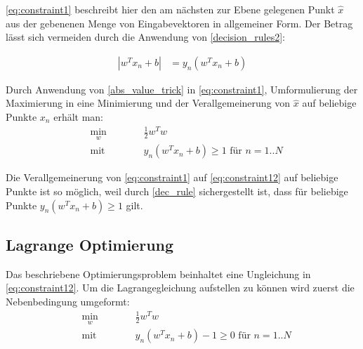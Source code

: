 \documentclass[a4paper,11pt,twoside]{scrreprt}
\begin{document}
\autoref{eq:constraint1} beschreibt hier den am nächsten zur Ebene gelegenen Punkt $\hat{x}$ aus der gebenenen Menge von Eingabevektoren in allgemeiner Form. Der Betrag lässt sich vermeiden durch die Anwendung von \autoref{decision_rules2}:

\begin{equation} \label{abs_value_trick}
	\begin{aligned}
		|w^{T} x_{n} + b| &= y_{n} (w^{T} x_{n} + b)
	\end{aligned}
\end{equation}


Durch Anwendung von \autoref{abs_value_trick} in \autoref{eq:constraint1}, Umformulierung der Maximierung in eine Minimierung und der Verallgemeinerung von $\hat{x}$ auf beliebige Punkte $x_{n}$ erhält man:
\begin{subequations}
	\begin{alignat}{2}
		&\!\min_{w}        &\qquad&  \frac{1}{2} w^{T} w \label{eq:optProb2}\\
		&\text{mit } &      & y_n (w^{T} x_{n} + b) \geq 1 \text{ für } n=1..N \label{eq:constraint12}
	\end{alignat}
\end{subequations}

Die Verallgemeinerung von \autoref{eq:constraint1} auf \autoref{eq:constraint12} auf beliebige Punkte ist so möglich, weil durch \autoref{dec_rule} sichergestellt ist, dass für beliebige Punkte $y_{n}(w^{T} x_{n} + b) \geq 1$ gilt.

\subsection{Lagrange Optimierung}

Das beschriebene Optimierungsproblem beinhaltet eine Ungleichung in \autoref{eq:constraint12}. Um die Lagrangegleichung aufstellen zu können wird zuerst die Nebenbedingung umgeformt:
\begin{subequations}
	\begin{alignat}{2}
		&\!\min_{w}        &\qquad&  \frac{1}{2} w^{T} w \label{eq:optProb3}\\
		&\text{mit } &      & y_n (w^{T} x_{n} + b)-1 \geq 0 \text{ für } n=1..N \label{eq:constraint13}
	\end{alignat}
\end{subequations}
\end{document}
